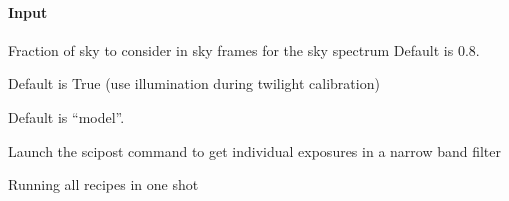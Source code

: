 \documentclass[letterpaper,10pt,english]{sphinxmanual}
\begin{document}
\begin{fulllineitems}
\begin{fulllineitems}
\paragraph{Input}
\label{\detokenize{api/pymusepipe:id105}}\begin{description}
\sphinxAtStartPar
Fraction of sky to consider in sky frames for the sky spectrum
Default is 0.8.

\sphinxAtStartPar
Default is True (use illumination during twilight calibration)

\sphinxAtStartPar
Default is “model”.

\end{description}

\end{fulllineitems}


\begin{fulllineitems}
\label{\detokenize{api/pymusepipe:pymusepipe.prep_recipes_pipe.PipePrep.run_prep_align}}
\pysigstartsignatures
{}
\pysigstopsignatures
\sphinxAtStartPar
Launch the scipost command to get individual exposures in a narrow
band filter

\end{fulllineitems}


\begin{fulllineitems}
\label{\detokenize{api/pymusepipe:pymusepipe.prep_recipes_pipe.PipePrep.run_recipes}}
\pysigstartsignatures
{}
\pysigstopsignatures
\sphinxAtStartPar
Running all recipes in one shot



\end{fulllineitems}
\end{fulllineitems}
\end{document}
